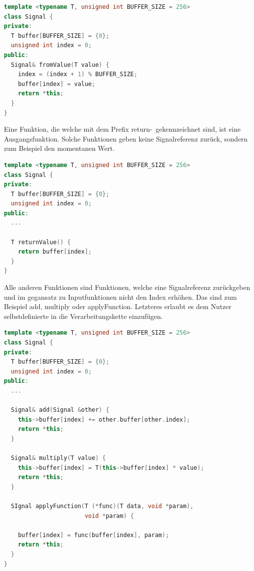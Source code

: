 \begin{lstlisting}[language=C++, 
                       frame=single, 
                       caption={Signalklasse Version 0.3},
                       captionpos=b]
template <typename T, unsigned int BUFFER_SIZE = 256>
class Signal {
private:
  T buffer[BUFFER_SIZE] = {0};
  unsigned int index = 0;
public:
  Signal& fromValue(T value) {
    index = (index + 1) % BUFFER_SIZE;
    buffer[index] = value;
    return *this;
  }
}
\end{lstlisting}

Eine Funktion, die welche mit dem Prefix \glqq return-\grqq\ 
gekennzeichnet sind, ist eine Ausgangsfunktion. 
Solche Funktionen geben keine Signalreferenz zurück, sondern zum Beispiel den 
momentanen Wert.

\begin{lstlisting}[language=C++, 
                       frame=single, 
                       caption={Signalklasse Version 0.3},
                       captionpos=b]
template <typename T, unsigned int BUFFER_SIZE = 256>
class Signal {
private:
  T buffer[BUFFER_SIZE] = {0};
  unsigned int index = 0;
public:
  ...

  T returnValue() {
    return buffer[index];
  }
}
\end{lstlisting}

Alle anderen Funktionen sind Funktionen, welche eine Signalreferenz zurückgeben
und im gegansatz zu Inputfunktionen nicht den Index erhöhen. Das sind zum Beispiel
add, multiply oder applyFunction. Letzteres erlaubt es dem Nutzer selbstdefinierte 
in die Verarbeitungskette einzufügen.

\begin{lstlisting}[language=C++, 
                       frame=single, 
                       caption={Signalklasse Version 0.4},
                       captionpos=b]
template <typename T, unsigned int BUFFER_SIZE = 256>
class Signal {
private:
  T buffer[BUFFER_SIZE] = {0};
  unsigned int index = 0;
public:
  ...

  Signal& add(Signal &other) {
    this->buffer[index] += other.buffer[other.index];
    return *this;
  }

  Signal& multiply(T value) {
    this->buffer[index] = T(this->buffer[index] * value);
    return *this;
  }

  SIgnal applyFunction(T (*func)(T data, void *param), 
                       void *param) {

    buffer[index] = func(buffer[index], param);
    return *this;
  }
}
\end{lstlisting}

